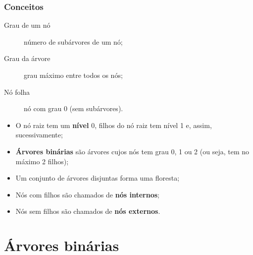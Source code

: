 \documentclass{beamer}
\begin{document}
\begin{frame}
  \frametitle{Conceitos}

  \begin{description}
    \item[Grau de um nó] número de subárvores de um nó;
    \item[Grau da árvore] grau máximo entre todos os nós;
    \item[Nó folha] nó com grau 0 (sem subárvores).
  \end{description}

  \begin{itemize}
    \item O nó raiz tem um \textbf{nível} 0, filhos do nó raiz tem nível 1 e,
          assim, sucessivamente;
    \item \textbf{Árvores binárias} são árvores cujos nós tem grau 0, 1 ou 2 (ou seja,
          tem no máximo 2 filhos);
    \item Um conjunto de árvores disjuntas forma uma floresta;
    \item Nós com filhos são chamados de \textbf{nós internos};
    \item Nós sem filhos são chamados de \textbf{nós externos}.
  \end{itemize}
\end{frame}

\section{Árvores binárias}
\end{document}
